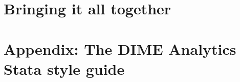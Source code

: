 
\chapter{Bringing it all together}




\chapter{Appendix: The DIME Analytics Stata style guide}
\label{ap:1}





\backmatter




\printindex %


